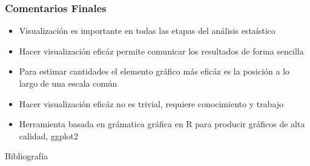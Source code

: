 \documentclass[9pt, spanish]{beamer}\usepackage[]{graphicx}\usepackage[]{color}
\begin{document}
\begin{frame}
\frametitle{Comentarios Finales}
\begin{itemize}
\item Visualizaci\'on es importante en todas las etapas del an\'alisis esta\'istico
\item Hacer visualizaci\'on efic\'az permite comunicar los resultados de forma sencilla
\item Para estimar cantidades el elemento gr\'afico m\'as efic\'az es la posici\'on a lo largo de una escala com\'un
\item Hacer visualizaci\'on efic\'az no es trivial, requiere conocimiento y trabajo
\item Herramienta basada en gr\'amatica gr\'afica en R para producir gr\'aficos de alta calidad, ggplot2
\end{itemize}
\end{frame}





\begin{frame}{Bibliograf\'ia}
\renewcommand\refname{\vskip -1cm}

%

\end{frame}
\end{document}
